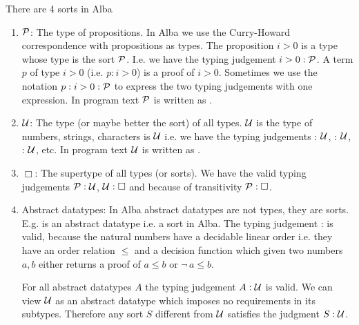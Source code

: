 \begin{definition}
  There are 4 sorts in Alba
  \begin{enumerate}

  \item ${\cal{P}}$: The type of propositions. In Alba we use the Curry-Howard
    correspondence with propositions as types. The proposition $i > 0$ is a
    type whose type is the sort ${\cal{P}}$. I.e. we have the typing judgement $i
    > 0 : {\cal{P}}$. A term $p$ of type $i > 0$ (i.e. $p:i > 0$) is a proof of $i
    > 0$. Sometimes we use the notation $p : i > 0 : {\cal{P}}$ to express the two
    typing judgements with one expression. In program text ${\cal{P}}$ is written as
    .


  \item ${\cal{U}}$: The type (or maybe better the sort) of all types. ${\cal{U}}$ is
    the type of numbers, strings, characters is ${\cal{U}}$ i.e. we have the typing
    judgements  : ${\cal{U}}$,  : ${\cal{U}}$,
     : ${\cal{U}}$, etc. In program text ${\cal{U}}$ is written as
    .


  \item $\Box$: The supertype of all types (or sorts). We have the
    valid typing judgements ${\cal{P}}: {\cal{U}}$, ${\cal{U}} : \Box$ and because of
    transitivity ${\cal{P}}: \Box$.


  \item Abstract datatypes: In Alba abstract datatypes are not types, they are
    sorts. E.g.  is an abstract datatype i.e. a sort in
    Alba. The typing judgement :  is valid,
    because the natural numbers have a decidable linear order i.e. they have
    an order relation $\le$ and a decision function which given two numbers
    $a, b$ either returns a proof of $a \le b$ or $\lnot\, a \le b$.

    For all abstract datatypes $A$ the typing judgement $A: {\cal{U}}$ is
    valid. We can view ${\cal{U}}$ as an abstract datatype which imposes no
    requirements in its subtypes. Therefore any sort $S$ different from ${\cal{U}}$
    satisfies the judgment $S: {\cal{U}}$.
  \end{enumerate}
\end{definition}


